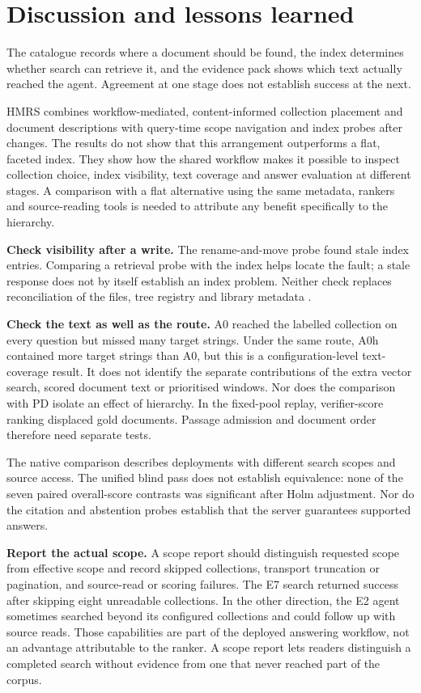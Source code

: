 \section{Discussion and lessons learned}
\label{sec:discussion}
The catalogue records where a document should be found, the index determines
whether search can retrieve it, and the evidence pack shows which text
actually reached the agent. Agreement at one stage does not establish
success at the next.

HMRS combines workflow-mediated, content-informed collection placement and
document descriptions with query-time scope navigation and index probes after
changes. The results do not show that this arrangement outperforms a flat,
faceted index. They show how the shared workflow makes it possible to inspect
collection choice, index visibility, text coverage and answer evaluation at
different stages. A comparison with a flat alternative using the same metadata,
rankers and source-reading tools is needed to attribute any benefit specifically
to the hierarchy.

\textbf{Check visibility after a write.} The rename-and-move probe found
stale index entries. Comparing a retrieval probe with the index helps
locate the fault; a stale response does not by itself establish an index
problem. Neither check replaces reconciliation of the files, tree registry and
library metadata \citep{park-metadata-quality-2009,paivarinta-ecm-2005}.

\textbf{Check the text as well as the route.} A0 reached the labelled
collection on every question but missed many target strings. Under the same route,
A0h contained more target strings than A0, but this is a configuration-level
text-coverage result. It does not identify the separate contributions of the
extra vector search, scored document text or prioritised windows. Nor does the
comparison with PD isolate an effect of hierarchy. In the fixed-pool replay,
verifier-score ranking displaced gold documents. Passage admission and
document order therefore need separate tests.

The native comparison describes deployments with different search scopes
and source access. The unified blind pass does not establish equivalence:
none of the seven paired overall-score contrasts was significant after Holm
adjustment. Nor do the citation and abstention probes establish that the
server guarantees supported answers.

\textbf{Report the actual scope.} A scope report should distinguish requested
scope from effective scope and record skipped collections, transport
truncation or pagination, and source-read or scoring failures. The E7
search returned success after skipping eight unreadable collections. In the
other direction, the E2 agent sometimes searched beyond its configured
collections and could follow up with source reads. Those capabilities are part
of the deployed answering workflow, not an advantage attributable to the
ranker. A scope report lets readers distinguish a completed search without
evidence from one that never reached part of the corpus.
